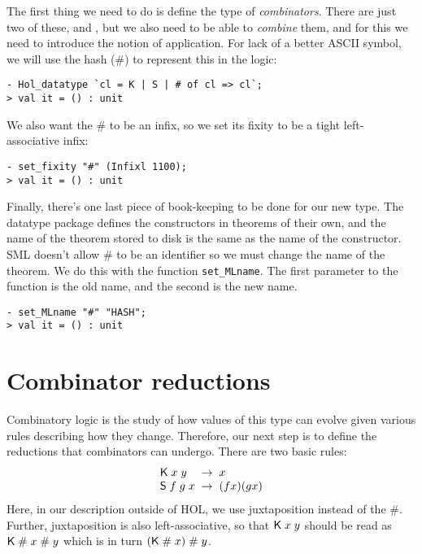The first thing we need to do is define the type of
\emph{combinators}.  There are just two of these, \KC{} and \SC, but
we also need to be able to \emph{combine} them, and for this we need
to introduce the notion of application.  For lack of a better ASCII
symbol, we will use the hash (\#) to represent this in the logic:
\setcounter{sessioncount}{0}
\begin{session}\begin{verbatim}
- Hol_datatype `cl = K | S | # of cl => cl`;
> val it = () : unit
\end{verbatim}\end{session}
We also want the \# to be an infix, so we set its fixity to be a tight
left-associative infix:
\begin{session}\begin{verbatim}
- set_fixity "#" (Infixl 1100);
> val it = () : unit
\end{verbatim}\end{session}
    Finally, there's one last piece of book-keeping to be done for our
    new type.  The datatype package defines the constructors in
    theorems of their own, and the name of the theorem stored to disk
    is the same as the name of the constructor.  SML doesn't allow \#
    to be an identifier so we must change the name of the theorem.  We
    do this with the function \texttt{set\_MLname}.  The first
    parameter to the function is the old name, and the second is the
    new name.
\begin{session}\begin{verbatim}
- set_MLname "#" "HASH";
> val it = () : unit
\end{verbatim}\end{session}




\section{Combinator reductions}
\label{sec:Comb-Reduct}

Combinatory logic is the study of how values of this type can evolve
given various rules describing how they change.  Therefore, our next
step is to define the reductions that combinators can undergo.  There
are two basic rules:
\[\begin{array}{l@{\;\;\rightarrow\;\;}l}
\KC\;x\;y & x\\
\SC\;f\;g\;x & (f x)(g x)
\end{array}\]
Here, in our description outside of HOL, we use juxtaposition instead
of the \#.  Further, juxtaposition is also left-associative, so that
${\sf K}\;x\;y$ should be read as ${\sf K}\;\#\;x\;\#\;y$ which is in
turn $({\sf K}\;\#\;x)\;\#\;y$.

